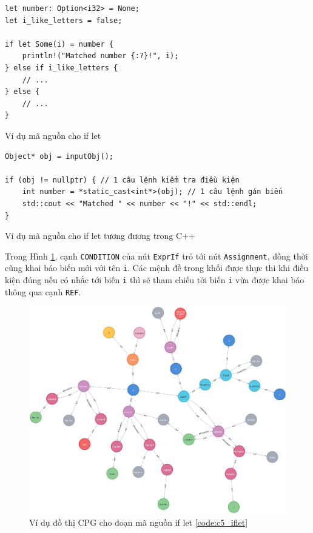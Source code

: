 \begin{listing}[H]
\begin{verbatim}
let number: Option<i32> = None;
let i_like_letters = false;

if let Some(i) = number {
    println!("Matched number {:?}!", i);
} else if i_like_letters {
    // ...
} else {
    // ...
}
\end{verbatim}
\caption{Ví dụ mã nguồn cho if let}
\label{code:c5_iflet}
\end{listing}

\begin{listing}[H]
\begin{verbatim}
Object* obj = inputObj();

if (obj != nullptr) { // 1 câu lệnh kiểm tra điều kiện
    int number = *static_cast<int*>(obj); // 1 câu lệnh gán biến
    std::cout << "Matched " << number << "!" << std::endl;
}
\end{verbatim}
\caption{Ví dụ mã nguồn cho if let tương đương trong C++}
\label{code:c5_iflet_cpp}
\end{listing}

Trong Hình \ref{img:c5_cpg_iflet}, cạnh \texttt{CONDITION} của nút \texttt{ExprIf} trỏ tới nút \texttt{Assignment}, đồng thời cũng khai báo biến mới với tên \texttt{i}.
Các mệnh đề trong khối được thực thi khi điều kiện đúng nếu có nhắc tới biến \texttt{i} thì sẽ tham chiếu tới biến \texttt{i} vừa được khai báo thông qua cạnh \texttt{REF}.

\begin{figure}[H]
\includegraphics[width=1\columnwidth]{figures/c5/c5_iflet.png}
\centering
\caption{Ví dụ đồ thị CPG cho đoạn mã nguồn if let \ref{code:c5_iflet}}
\label{img:c5_cpg_iflet}
\end{figure}

